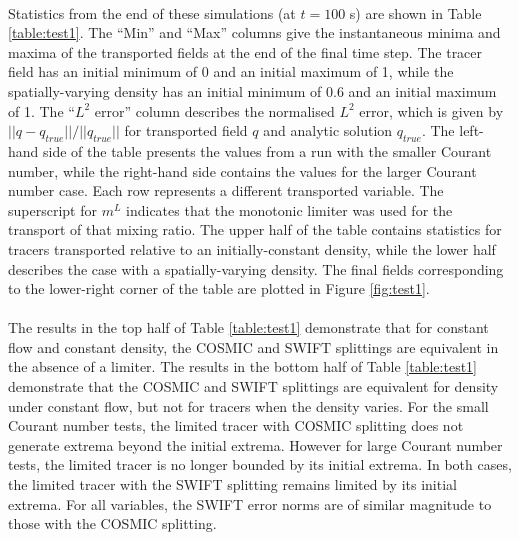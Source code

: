 \documentclass{ametsocV6.1}
\begin{document}
\\
Statistics from the end of these simulations (at $t=100$ s) are shown in Table \ref{table:test1}.
The ``Min'' and ``Max'' columns give the instantaneous minima and maxima of the transported fields at the end of the final time step.
The tracer field has an initial minimum of 0 and an initial maximum of 1, while the spatially-varying density has an initial minimum of 0.6 and an initial maximum of 1.
The ``$L^2$ error'' column describes the normalised $L^2$ error, which is given by $||q - q_{true}||/||q_{true}||$ for transported field $q$ and analytic solution $q_{true}$.
The left-hand side of the table presents the values from a run with the smaller Courant number, while the right-hand side contains the values for the larger Courant number case.
Each row represents a different transported variable.
The superscript for $m^L$ indicates that the monotonic limiter was used for the transport of that mixing ratio.
The upper half of the table contains statistics for tracers transported relative to an initially-constant density, while the lower half describes the case with a spatially-varying density.
The final fields corresponding to the lower-right corner of the table are plotted in Figure \ref{fig:test1}.\\
\\
The results in the top half of Table \ref{table:test1} demonstrate that for constant flow and constant density, the COSMIC and SWIFT splittings are equivalent in the absence of a limiter. The results in the bottom half of Table \ref{table:test1} demonstrate that the COSMIC and SWIFT splittings are equivalent for density under constant flow, but not for tracers when the density varies. 
For the small Courant number tests, the limited tracer with COSMIC splitting does not generate extrema beyond the initial extrema.
However for large Courant number tests, the limited tracer is no longer bounded by its initial extrema.
In both cases, the limited tracer with the SWIFT splitting remains limited by its initial extrema.
For all variables, the SWIFT error norms are of similar magnitude to those with the COSMIC splitting.
\end{document}
